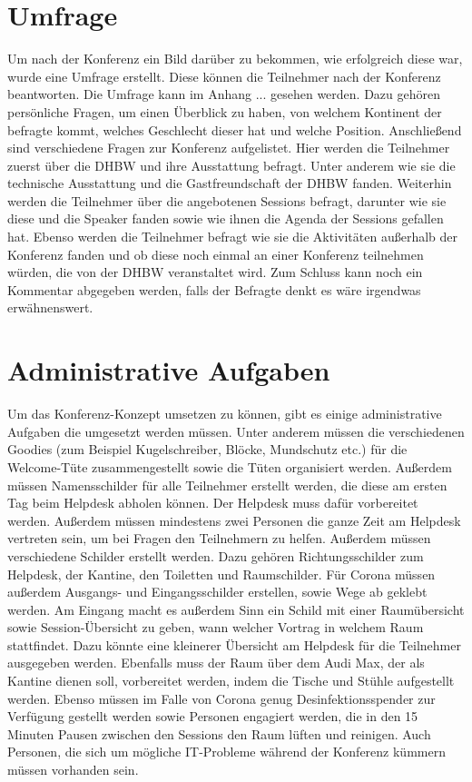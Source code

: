 \section{Umfrage}
Um nach der Konferenz ein Bild darüber zu bekommen, wie erfolgreich diese war, wurde eine Umfrage erstellt. Diese können die Teilnehmer nach der Konferenz beantworten. Die Umfrage kann im Anhang ... gesehen werden. Dazu gehören persönliche Fragen, um einen Überblick zu haben, von welchem Kontinent der befragte kommt, welches Geschlecht dieser hat und welche Position. Anschließend sind verschiedene Fragen zur Konferenz aufgelistet. Hier werden die Teilnehmer zuerst über die DHBW und ihre Ausstattung befragt. Unter anderem wie sie die technische Ausstattung und die Gastfreundschaft der DHBW fanden. Weiterhin werden die Teilnehmer über die angebotenen Sessions befragt, darunter wie sie diese und die Speaker fanden sowie wie ihnen die Agenda der Sessions gefallen hat. Ebenso werden die Teilnehmer befragt wie sie die Aktivitäten außerhalb der Konferenz fanden und ob diese noch einmal an einer Konferenz teilnehmen würden, die von der DHBW veranstaltet wird. Zum Schluss kann noch ein Kommentar abgegeben werden, falls der Befragte denkt es wäre irgendwas erwähnenswert.  

\section{Administrative Aufgaben}
Um das Konferenz-Konzept umsetzen zu können, gibt es einige administrative Aufgaben die umgesetzt werden müssen. Unter anderem müssen die verschiedenen Goodies (zum Beispiel Kugelschreiber, Blöcke, Mundschutz etc.) für die Welcome-Tüte zusammengestellt sowie die Tüten organisiert werden. Außerdem müssen Namensschilder für alle Teilnehmer erstellt werden, die diese am ersten Tag beim Helpdesk abholen können. Der Helpdesk muss dafür vorbereitet werden. Außerdem müssen mindestens zwei Personen die ganze Zeit am Helpdesk vertreten sein, um bei Fragen den Teilnehmern zu helfen. Außerdem müssen verschiedene Schilder erstellt werden. Dazu gehören Richtungsschilder zum Helpdesk, der Kantine, den Toiletten und Raumschilder. Für Corona müssen außerdem Ausgangs- und Eingangsschilder erstellen, sowie Wege ab geklebt werden. Am Eingang macht es außerdem Sinn ein Schild mit einer Raumübersicht sowie Session-Übersicht zu geben, wann welcher Vortrag in welchem Raum stattfindet. Dazu könnte eine kleinerer Übersicht am Helpdesk für die Teilnehmer ausgegeben werden. Ebenfalls muss der Raum über dem Audi Max, der als Kantine dienen soll, vorbereitet werden, indem die Tische und Stühle aufgestellt werden. Ebenso müssen im Falle von Corona genug Desinfektionsspender zur Verfügung gestellt werden sowie Personen engagiert werden, die in den 15 Minuten Pausen zwischen den Sessions den Raum lüften und reinigen. Auch Personen, die sich um mögliche IT-Probleme während der Konferenz kümmern müssen vorhanden sein. 


